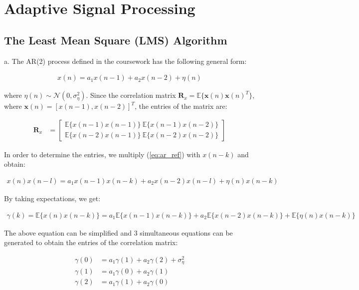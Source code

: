 \section{Adaptive Signal Processing}

\subsection{The Least Mean Square (LMS) Algorithm}

\noindent{}a. The AR(2) process defined in the coursework has the following general form:

\begin{align}
x(n) = a_1 x(n-1) + a_2 x(n-2) + \eta(n) \label{eq:ar_ref}
\end{align}

\noindent{}where $\eta(n) \sim \mathcal{N}(0,\sigma_{\eta}^2)$. Since the correlation matrix $\textbf{R}_x = \mathbb{E}\{\textbf{x}(n)\textbf{x}(n)^T\}$, where $\textbf{x}(n)=[x(n-1), x(n-2)]^T$, the entries of the matrix are:

\begin{align*}
\textbf{R}_x &= 
\begin{bmatrix}
\mathbb{E}\{x(n-1)x(n-1)\} \ \mathbb{E}\{x(n-1)x(n-2)\} \\ 
\mathbb{E}\{x(n-2)x(n-1)\} \ \mathbb{E}\{x(n-2)x(n-2)\}
\end{bmatrix}
\end{align*} 

\noindent{}In order to determine the entries, we multiply (\ref{eq:ar_ref}) with $x(n-k)$ and obtain:

\begin{align*}
x(n)x(n-l) = a_1 x(n-1)x(n-k) + a_2 x(n-2)x(n-l) + \eta(n)x(n-k)
\end{align*}

\noindent{}By taking expectations, we get:

\begin{align*}
\gamma(k) = \mathbb{E}\{x(n)x(n-k)\} =  a_1 \mathbb{E}\{x(n-1)x(n-k)\} + a_2  \mathbb{E}\{x(n-2)x(n-k)\}  + \mathbb{E}\{\eta(n)x(n-k)\}
\end{align*}

\noindent{}The above equation can be simplified and 3 simultaneous equations can be generated to obtain the entries of the correlation matrix:

\begin{align*}
\gamma(0) &= a_1 \gamma(1) + a_2\gamma(2) + \sigma_{\eta}^2 \\
\gamma(1) &= a_1 \gamma(0) + a_2\gamma(1) \\
\gamma(2) &= a_1 \gamma(1) + a_2\gamma(0)
\end{align*}

